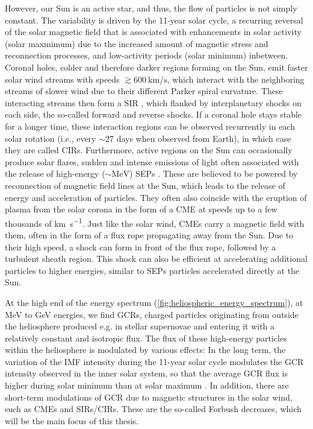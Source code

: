 However, our Sun is an active star, and thus, the flow of particles is not simply constant. The variability is driven by the 11-year solar cycle, a recurring reversal of the solar magnetic field that is associated with enhancements in solar activity (solar maxmimum) due to the increased amount of magnetic stress and reconnection processes, and low-activity periods (solar minimum) inbetween.
Coronal holes, colder and therefore darker regions forming on the Sun, emit faster solar wind streams with speeds $\gtrsim \SI{600}{\kilo\meter\per\second}$, which interact with the neighboring streams of slower wind due to their different Parker spiral curvature. These interacting streams then form a \acl{SIR} \citep[\acs{SIR}, e.g.][]{Richardson-2018}, which flanked by interplanetary shocks on each side, the so-called forward and reverse shocks. If a coronal hole stays stable for a longer time, these interaction regions can be observed recurrently in each solar rotation (i.e., every $\sim$27 days when observed from Earth), in which case they are called \acp{CIR}.
Furthermore, active regions on the Sun can occasionally produce solar flares, sudden and intense emissions of light often associated with the release of high-energy ($\sim \si{\mega\electronvolt}$) \aclp{SEP} \citep[\acsp{SEP}, e.g.][]{Reames-1990}.
These are believed to be powered by reconnection of magnetic field lines at the Sun, which leads to the release of energy and acceleration of particles.
They often also coincide with the eruption of plasma from the solar corona in the form of a \ac{CME} at speeds up to a few thousands of \si{\kilo\meter\per\second}.
Just like the solar wind, \acp{CME} carry a magnetic field with them, often in the form of a flux rope propagating away from the Sun. Due to their high speed, a shock can form in front of the flux rope, followed by a turbulent sheath region.
This shock can also be efficient at accelerating additional particles to higher energies, similar to \acp{SEP} particles accelerated directly at the Sun.

At the high end of the energy spectrum (\autoref{fig:heliospheric_energy_spectrum}), at \si{\mega\electronvolt} to  \si{\giga\electronvolt} energies, we find \acp{GCR}, charged particles originating from outside the heliosphere produced e.g. in stellar supernovae and entering it with a relatively constant and isotropic flux. 
The flux of these high-energy particles within the heliosphere is modulated by various effects: In the long term, the variation of the \ac{IMF} intensity during the 11-year solar cycle modulates the \ac{GCR} intensity observed in the inner solar system, so that the average \ac{GCR} flux is higher during solar minimum than at solar maximum \citep{Fisk-1980}. In addition, there are short-term modulations of \ac{GCR} due to magnetic structures in the solar wind, such as \acp{CME} and \acp{SIR}/\acp{CIR}. These are the so-called Forbush decreases, which will be the main focus of this thesis.

